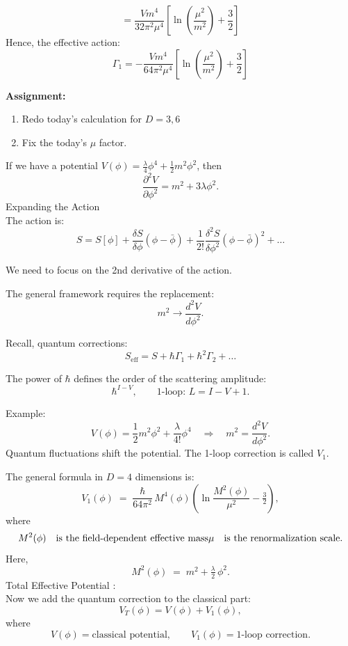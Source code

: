\documentclass[14pt]{article} %
\begin{document}
\[
= \frac{V m^4}{32 \pi^2 \mu^4} \left[
\ln\!\left( \frac{\mu^2}{m^2} \right) + \frac{3}{2}
\right]
\]
Hence, the effective action:
\[
\Gamma_1 = - \frac{Vm^4}{64 \pi^2 \mu^4} 
\left[
\ln\!\left( \frac{\mu^2}{m^2} \right) + \frac{3}{2}
\right]
\]

\begin{tcolorbox}
\textbf{Assignment:}
\begin{enumerate}
    \item Redo today's calculation for $D=3,6$
    \item Fix the today's $\mu$ factor.
\end{enumerate}
\end{tcolorbox}
If we have a potential $V(\phi) = \frac{\lambda}{4} \phi^4 + \frac{1}{2} m^2 \phi^2$,
then
\[
\frac{\partial^2 V}{\partial \phi^2}
= m^2 + 3 \lambda \phi^2.
\]
Expanding the Action\\

The action is:
\[
S = S[\phi] + \frac{\delta S}{\delta \phi} (\phi - \bar{\phi})
+ \frac{1}{2!} \frac{\delta^2 S}{\delta \phi^2} (\phi - \bar{\phi})^2 + \dots
\]

We need to focus on the 2nd derivative of the action.

The general framework requires the replacement:
\[
m^2 \longrightarrow \frac{d^2 V}{d\phi^2}.
\]

Recall, quantum corrections:
\[
S_{\text{eff}} = S + \hbar \Gamma_1 + \hbar^2 \Gamma_2 + \dots
\]

The power of $\hbar$ defines the order of the scattering amplitude:
\[
\hbar^{I - V}, \qquad \text{1-loop: } L = I - V + 1.
\]

Example:
\[
V(\phi) = \frac{1}{2} m^2 \phi^2 + \frac{\lambda}{4!} \phi^4
\quad \Rightarrow \quad
m^2 = \frac{d^2 V}{d\phi^2}.
\]
Quantum fluctuations shift the potential.  
The 1-loop correction is called \(V_1\).

The general formula in \(D=4\) dimensions is:
\[
V_1(\phi) \;=\; \frac{\hbar}{64\pi^2} \, M^4(\phi) 
\left( \ln\frac{M^2(\phi)}{\mu^2} - \tfrac{3}{2} \right),
\]
where
\[
M^2(\phi) \quad \text{is the field-dependent effective mass} \\
\mu \quad \text{is the renormalization scale}.
\]
Here,
\[
M^2(\phi) \;=\; m^2 + \tfrac{\lambda}{2}\,\phi^2.
\]
Total Effective Potential : \\
Now we add the quantum correction to the classical part:
\[
V_T(\phi) = V(\phi) + V_1(\phi),
\]
where
\[
V(\phi) = \text{classical potential}, \qquad
V_1(\phi) = \text{1-loop correction}.
\]
\end{document}
